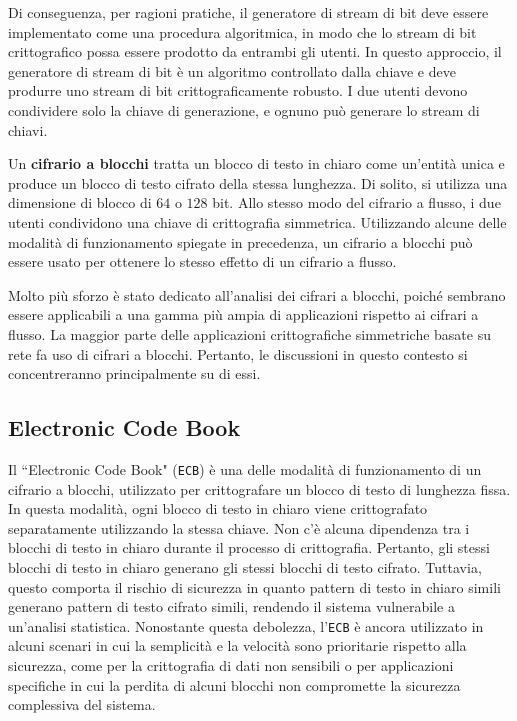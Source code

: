 Di conseguenza, per ragioni pratiche, il generatore di stream di bit deve
essere implementato come una procedura algoritmica, in modo che lo stream di
bit crittografico possa essere prodotto da entrambi gli utenti. In questo
approccio, il generatore di stream di bit è un algoritmo controllato dalla chiave
e deve produrre uno stream di bit crittograficamente robusto. I due utenti devono
condividere solo la chiave di generazione, e ognuno può generare lo stream di chiavi.

Un \textbf{cifrario a blocchi} tratta un blocco di testo in chiaro come un'entità
unica e produce un blocco di testo cifrato della stessa lunghezza. Di solito,
si utilizza una dimensione di blocco di $64$ o $128$ bit. Allo stesso modo del 
cifrario a flusso, i due utenti condividono una chiave di crittografia simmetrica.
Utilizzando alcune delle modalità di funzionamento spiegate in precedenza, un
cifrario a blocchi può essere usato per ottenere lo stesso effetto di un cifrario
a flusso.

Molto più sforzo è stato dedicato all'analisi dei cifrari a blocchi, poiché
sembrano essere applicabili a una gamma più ampia di applicazioni rispetto ai
cifrari a flusso. La maggior parte delle applicazioni crittografiche simmetriche
basate su rete fa uso di cifrari a blocchi. Pertanto, le discussioni in questo
contesto si concentreranno principalmente su di essi.

\subsection{Electronic Code Book}
Il ``Electronic Code Book" (\verb|ECB|) è una
delle modalità di funzionamento di un cifrario a blocchi, utilizzato per
crittografare un blocco di testo di lunghezza fissa. In questa modalità,
ogni blocco di testo in chiaro viene crittografato separatamente utilizzando
la stessa chiave. Non c'è alcuna dipendenza tra i blocchi di testo in chiaro
durante il processo di crittografia. Pertanto, gli stessi blocchi di testo in
chiaro generano gli stessi blocchi di testo cifrato. Tuttavia, questo comporta
il rischio di sicurezza in quanto pattern di testo in chiaro simili generano
pattern di testo cifrato simili, rendendo il sistema vulnerabile a un'analisi
statistica. Nonostante questa debolezza, l'\verb|ECB| è ancora utilizzato in alcuni
scenari in cui la semplicità e la velocità sono prioritarie rispetto alla
sicurezza, come per la crittografia di dati non sensibili o per applicazioni
specifiche in cui la perdita di alcuni blocchi non compromette la sicurezza
complessiva del sistema.

